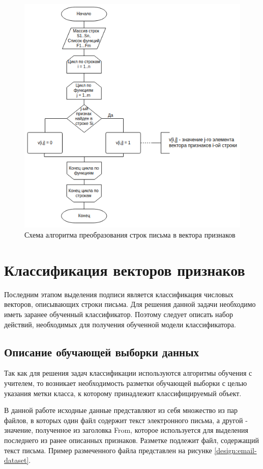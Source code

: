 \begin{figure}[h!]
	\centering
	\includegraphics[width=\textwidth]{inc/img/alg-features.png}
	\caption{Схема алгоритма преобразования строк письма в вектора признаков}
	\label{design:alg-features}
\end{figure}


\section{Классификация векторов признаков}
Последним этапом выделения подписи является классификация числовых векторов, описывающих строки письма. Для решения данной задачи необходимо иметь заранее обученный классификатор.
Поэтому следует описать набор действий, необходимых для получения обученной модели классификатора.

\subsection{Описание обучающей выборки данных}
Так как для решения задач классификации используются алгоритмы обучения с учителем, то возникает необходимость разметки обучающей выборки с целью указания метки класса, к которому принадлежит классифицируемый объект.

В данной работе исходные данные представляют из себя множество из пар файлов, в которых один файл содержит текст электронного письма, а другой - значение, полученное из заголовка From, которое используется для выделения последнего из ранее описанных признаков. Разметке подлежит файл, содержащий текст письма. Пример размеченного файла представлен на рисунке \ref{design:email-dataset}.


